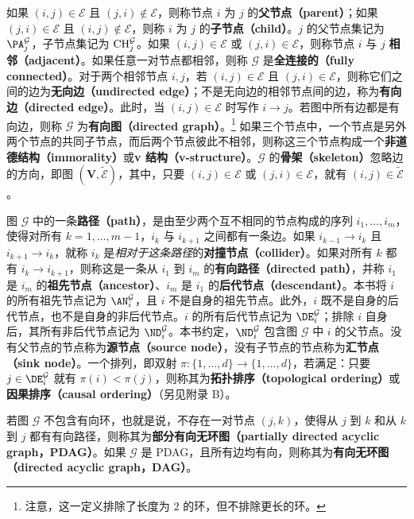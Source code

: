 如果 $(i,j)\in\mathcal E$ 且 $(j,i)\notin\mathcal E$，则称节点 $i$ 为 $j$ 的\textbf{父节点（parent）}；如果 $(j,i)\in\mathcal E$ 且 $(i,j)\notin\mathcal E$，则称 $i$ 为 $j$ 的\textbf{子节点（child）}。$j$ 的父节点集记为 $\PA_j^{\mathcal G}$，子节点集记为 $\mathrm{CH}_j^{\mathcal G}$。如果 $(i,j)\in\mathcal E$ 或 $(j,i)\in\mathcal E$，则称节点 $i$ 与 $j$ \textbf{相邻（adjacent）}。如果任意一对节点都相邻，则称 $\mathcal G$ 是\textbf{全连接的（fully connected）}。对于两个相邻节点 $i,j$，若 $(i,j)\in\mathcal E$ 且 $(j,i)\in\mathcal E$，则称它们之间的边为\textbf{无向边（undirected edge）}；不是无向边的相邻节点间的边，称为\textbf{有向边（directed edge）}。此时，当 $(i,j)\in\mathcal E$ 时写作 $i\to j$。若图中所有边都是有向边，则称 $\mathcal G$ 为\textbf{有向图（directed graph）}。\footnote{注意，这一定义排除了长度为 $2$ 的环，但不排除更长的环。}
如果三个节点中，一个节点是另外两个节点的共同子节点，而后两个节点彼此不相邻，则称这三个节点构成一个\textbf{非道德结构（immorality）}或\textbf{v 结构（v-structure）}。$\mathcal G$ 的\textbf{骨架（skeleton）}忽略边的方向，即图 $(\mathbf V,\widetilde{\mathcal E})$，其中，只要 $(i,j)\in\mathcal E$ 或 $(j,i)\in\mathcal E$，就有 $(i,j)\in\widetilde{\mathcal E}$。

图 $\mathcal G$ 中的一条\textbf{路径（path）}，是由至少两个互不相同的节点构成的序列 $i_1,\ldots,i_m$，使得对所有 $k=1,\ldots,m-1$，$i_k$ 与 $i_{k+1}$ 之间都有一条边。如果 $i_{k-1}\to i_k$ 且 $i_{k+1}\to i_k$，就称 $i_k$ 是\emph{相对于这条路径}的\textbf{对撞节点（collider）}。如果对所有 $k$ 都有 $i_k\to i_{k+1}$，则称这是一条从 $i_1$ 到 $i_m$ 的\textbf{有向路径（directed path）}，并称 $i_1$ 是 $i_m$ 的\textbf{祖先节点（ancestor）}、$i_m$ 是 $i_1$ 的\textbf{后代节点（descendant）}。本书将 $i$ 的所有祖先节点记为 $\AN_i^{\mathcal G}$，且 $i$ 不是自身的祖先节点。此外，$i$ 既不是自身的后代节点，也不是自身的非后代节点。$i$ 的所有后代节点记为 $\DE_i^{\mathcal G}$；排除 $i$ 自身后，其所有非后代节点记为 $\ND_i^{\mathcal G}$。本书约定，$\ND_i^{\mathcal G}$ 包含图 $\mathcal G$ 中 $i$ 的父节点。没有父节点的节点称为\textbf{源节点（source node）}，没有子节点的节点称为\textbf{汇节点（sink node）}。一个排列，即双射 $\pi:\{1,\ldots,d\}\to\{1,\ldots,d\}$，若满足：只要 $j\in\DE_i^{\mathcal G}$ 就有 $\pi(i)<\pi(j)$，则称其为\textbf{拓扑排序（topological ordering）}或\textbf{因果排序（causal ordering）}（另见附录 B）。

若图 $\mathcal G$ 不包含有向环，也就是说，不存在一对节点 $(j,k)$，使得从 $j$ 到 $k$ 和从 $k$ 到 $j$ 都有有向路径，则称其为\textbf{部分有向无环图（partially directed acyclic graph，PDAG）}。如果 $\mathcal G$ 是 PDAG，且所有边均有向，则称其为\textbf{有向无环图（directed acyclic graph，DAG）}。

